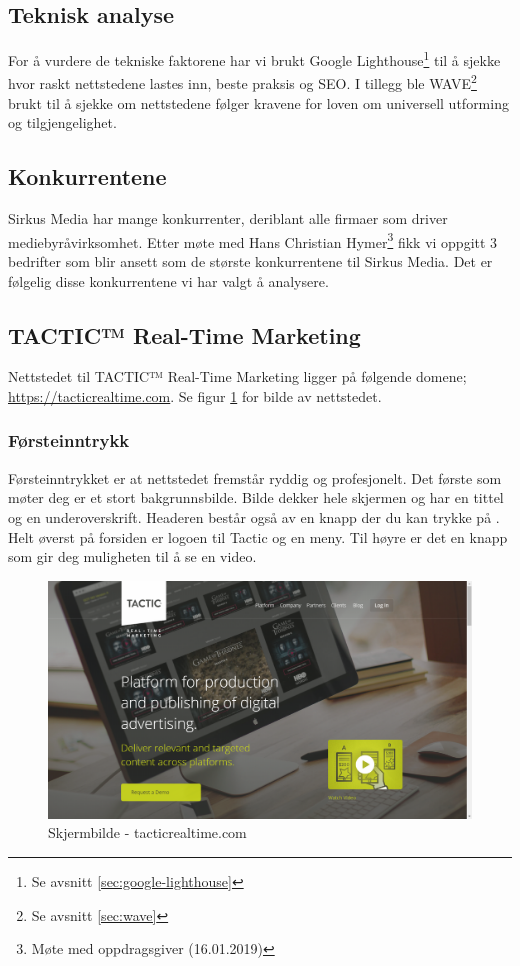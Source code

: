 \subsection{Teknisk analyse}
For å vurdere de tekniske faktorene har vi brukt Google Lighthouse\footnote{Se avsnitt \ref{sec:google-lighthouse}} til å sjekke hvor raskt nettstedene lastes inn, beste praksis og SEO. I tillegg ble WAVE\footnote{Se avsnitt \ref{sec:wave}} brukt til å sjekke om nettstedene følger kravene for loven om universell utforming og tilgjengelighet.

\subsection{Konkurrentene}
Sirkus Media har mange konkurrenter, deriblant alle firmaer som driver mediebyråvirksomhet. Etter møte med Hans Christian Hymer\footnote{Møte med oppdragsgiver (16.01.2019)} fikk vi oppgitt 3 bedrifter som blir ansett som de største konkurrentene til Sirkus Media. Det er følgelig disse konkurrentene vi har valgt å analysere.

\subsection{TACTIC™ Real-Time Marketing}
Nettstedet til TACTIC™ Real-Time Marketing ligger på følgende domene; \url{https://tacticrealtime.com}. Se figur \ref{fig:competitors-tacticrealtime.com} for bilde av nettstedet.

\subsubsection{Førsteinntrykk}
Førsteinntrykket er at nettstedet fremstår ryddig og profesjonelt. Det første som møter deg er et stort bakgrunnsbilde. Bilde dekker hele skjermen og har en tittel og en underoverskrift. Headeren består også av en knapp der du kan trykke på . Helt øverst på forsiden er logoen til Tactic og en meny. Til høyre er det en knapp som gir deg muligheten til å se en video. 

\begin{figure}[H]
    \centering
    \includegraphics[width=\textwidth]{line/tacticrealtime_com_(1366x768).png}
    \caption{Skjermbilde - tacticrealtime.com}
    \label{fig:competitors-tacticrealtime.com}
\end{figure}

